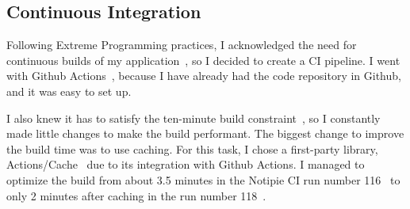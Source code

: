 \subsection{Continuous Integration}\label{sec:continuous-integration}

Following Extreme Programming practices,
I acknowledged the need for
continuous builds of my application~\cite[pp.~49-50]{beck_extreme_2004},
so I decided to create a CI pipeline.
I went with Github Actions~\cite{github_inc_github_2022-1},
because I have already had
the code repository in Github,
and it was easy to set up.

I also knew it has to satisfy
the ten-minute build constraint~\cite[p.~49]{beck_extreme_2004},
so I constantly made little changes
to make the build performant.
The biggest change to improve
the build time was to use caching.
For this task, I chose a first-party library,
Actions/Cache~\cite{sharma_actionscache_2022}
due to its integration with Github Actions.
I managed to optimize the build
from about 3.5 minutes
in the Notipie CI run number 116~
to only 2 minutes after caching
in the run number 118~.


